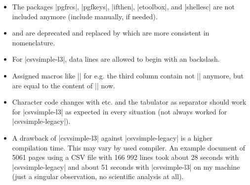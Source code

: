 \documentclass[a4paper,11pt]{ltxdoc}
\begin{document}
\begin{itemize}
\item The packages |pgfrcs|, |pgfkeys|, |ifthen|, |etoolbox|, and |shellesc|
  are not included anymore (include manually, if needed).
\item
   and
   are deprecated and replaced by
  which are more consistent in nomenclature.
\item For |csvsimple-l3|, data lines are allowed to begin with an backslash.
\item Assigned macros like |\myname| for e.g. the third column contain
  not |\csvcoliii| anymore, but are equal to the content of |\csvcoliii| now.
\item Character code changes with  etc.
  and the tabulator as separator should work for |csvsimple-l3| as expected in every
  situation (not always worked for |csvsimple-legacy|).
\item A drawback of |csvsimple-l3| against |csvsimple-legacy| is
  a higher compilation time. This may vary by used compiler.
  An example document of 5061 pages using a CSV file with 166 992 lines
  took about 28 seconds with |csvsimple-legacy| and
  about 51 seconds with |csvsimple-l3| on my machine
  (just a singular observation, no scientific analysis at all).
\end{itemize}
\end{document}
